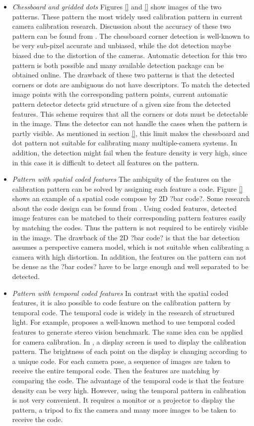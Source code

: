 \documentclass{report}
\begin{document}
\begin{itemize}
	\item \textit{Chessboard and gridded dots} Figures \ref{} and \ref{} show images of the two patterns. These pattern the most widely used calibration pattern in current camera calibration research. Discussion about the accuracy of these two pattern can be found from \cite{mallon2007pattern}. The chessboard corner detection is well-known to be very sub-pixel accurate and unbiased, while the dot detection maybe biased due to the distortion of the cameras. Automatic detection for this two pattern is both possible and many available detection package can be obtained online. %
	The drawback of these two patterns is that the detected corners or dots are ambiguous do not have descriptors. To match the detected image points with the corresponding pattern points, current automatic pattern detector detects grid structure of a given size from the detected features. This scheme requires that all the corners or dots must be detectable in the image. Thus the detector can not handle the cases when the pattern is partly visible. As mentioned in section \ref{}, this limit makes the chessboard and dot pattern not suitable for calibrating many multiple-camera systems. In addition, the detection might fail when the feature density is very high, since in this case it is difficult to detect all features on the pattern. 
	\item \textit{Pattern with spatial coded features} The ambiguity of the features on the calibration pattern can be solved by assigning each feature a code. Figure \ref{} shows an example of a spatial code compose by 2D ?bar code?. Some research about the code design can be found from \cite{}. Using coded features, detected image features can be matched to their corresponding pattern features easily by matching the codes. Thus the pattern is not required to be entirely visible in the image. The drawback of the 2D ?bar code? is that the bar detection assumes a perspective camera model, which is not suitable when calibrating a camera with high distortion. In addition, the features on the pattern can not be dense as the ?bar codes? have to be large enough and well separated to be detected. 
	\item \textit{Pattern with temporal coded features} In contrast with the spatial coded features, it is also possible to code feature on the calibration pattern by temporal code. The temporal code is widely in the research of structured light. For example, \cite{} proposes a well-known method to use temporal coded features to generate stereo vision benchmark. The same idea can be applied for camera calibration. In \cite{}, a display screen is used to display the calibration pattern. The brightness of each point on the display is changing according to a unique code. For each camera pose, a sequence of images are taken to receive the entire temporal code. Then the features are matching by comparing the code. The advantage of the temporal code is that the feature density can be very high. However, using the temporal pattern in calibration is not very convenient. It requires a monitor or a projector to display the pattern, a tripod to fix the camera and many more images to be taken to receive the code. 

\end{itemize}
\end{document}
